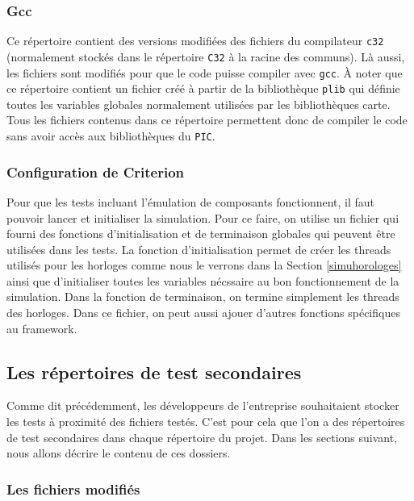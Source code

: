 \documentclass[a4paper]{article}
\begin{document}
\subsubsection*{Gcc}
\label{gcc}

Ce répertoire contient des versions modifiées des fichiers du compilateur
\verb|c32| (normalement stockés dans le répertoire \verb|C32| à la racine des
communs). Là aussi, les fichiers sont modifiés pour que le code puisse compiler
avec \verb|gcc|. À noter que ce répertoire contient un fichier créé à partir de
la bibliothèque \verb|plib| qui définie toutes les variables globales
normalement utilisées par les bibliothèques carte. Tous les fichiers contenus
dans ce répertoire permettent donc de compiler le code sans avoir accès aux
bibliothèques du \verb|PIC|.

\subsubsection*{Configuration de Criterion}
\label{configuration-de-criterion}

Pour que les tests incluant l'émulation de composants fonctionnent, il faut
pouvoir lancer et initialiser la simulation. Pour ce faire, on utilise un
fichier qui fourni des fonctions d'initialisation et de terminaison globales qui
peuvent être utilisées dans les tests. La fonction d'initialisation permet de
créer les threads utilisés pour les horloges comme nous le verrons dans la
Section \ref{simuhorologes} ainsi que d'initialiser toutes les variables
nécssaire au bon fonctionnement de la simulation. Dans la fonction de
terminaison, on termine simplement les threads des horloges. Dans ce fichier, on
peut aussi ajouer d'autres fonctions spécifiques au framework.

\subsection{Les répertoires de test secondaires}

Comme dit précédemment, les développeurs de l'entreprise souhaitaient stocker
les tests à proximité des fichiers testés. C'est pour cela que l'on a des
répertoires de test secondaires dans chaque répertoire du projet. Dans les
sections suivant, nous allons décrire le contenu de ces dossiers.

\subsubsection{Les fichiers modifiés}
\end{document}
